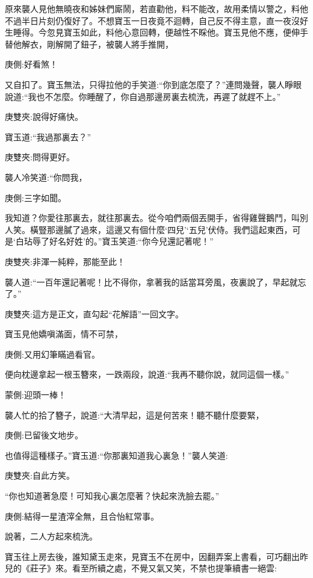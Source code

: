 \begin{parag}
    原來襲人見他無曉夜和姊妹們廝鬧，若直勸他，料不能改，故用柔情以警之，料他不過半日片刻仍復好了。不想寶玉一日夜竟不迴轉，自己反不得主意，直一夜沒好生睡得。今忽見寶玉如此，料他心意回轉，便越性不睬他。寶玉見他不應，便伸手替他解衣，剛解開了鈕子，被襲人將手推開，\begin{note}庚側:好看煞！\end{note}又自扣了。寶玉無法，只得拉他的手笑道:“你到底怎麼了？”連問幾聲，襲人睜眼說道:“我也不怎麼。你睡醒了，你自過那邊房裏去梳洗，再遲了就趕不上。”\begin{note}庚雙夾:說得好痛快。\end{note}寶玉道:“我過那裏去？”\begin{note}庚雙夾:問得更好。\end{note}襲人冷笑道:“你問我，\begin{note}庚側:三字如聞。\end{note}我知道？你愛往那裏去，就往那裏去。從今咱們兩個丟開手，省得雞聲鵝鬥，叫別人笑。橫豎那邊膩了過來，這邊又有個什麼‘四兒’‘五兒’伏侍。我們這起東西，可是‘白玷辱了好名好姓’的。”寶玉笑道:“你今兒還記著呢！”\begin{note}庚雙夾:非渾一純粹，那能至此！\end{note}襲人道:“一百年還記著呢！比不得你，拿著我的話當耳旁風，夜裏說了，早起就忘了。”\begin{note}庚雙夾:這方是正文，直勾起“花解語”一回文字。\end{note}寶玉見他嬌嗔滿面，情不可禁，\begin{note}庚側:又用幻筆瞞過看官。\end{note}便向枕邊拿起一根玉簪來，一跌兩段，說道:“我再不聽你說，就同這個一樣。”\begin{note}蒙側:迎頭一棒！\end{note}襲人忙的拾了簪子，說道:“大清早起，這是何苦來！聽不聽什麼要緊，\begin{note}庚側:已留後文地步。\end{note}也值得這種樣子。”寶玉道:“你那裏知道我心裏急！”襲人笑道:\begin{note}庚雙夾:自此方笑。\end{note}“你也知道著急麼！可知我心裏怎麼著？快起來洗臉去罷。”\begin{note}庚側:結得一星渣滓全無，且合怡紅常事。\end{note}說著，二人方起來梳洗。
\end{parag}


\begin{parag}
    寶玉往上房去後，誰知黛玉走來，見寶玉不在房中，因翻弄案上書看，可巧翻出昨兒的《莊子》來。看至所續之處，不覺又氣又笑，不禁也提筆續書一絕雲:
\end{parag}


